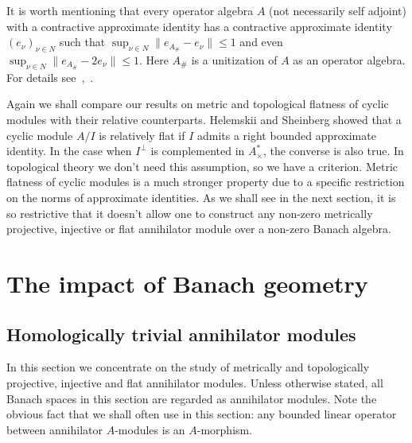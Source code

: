 It is worth mentioning that every operator algebra $A$ (not necessarily self
adjoint) with a contractive approximate identity has a contractive approximate
identity ${(e_\nu)}_{\nu\in N}$ such 
that $\sup_{\nu\in N}\lVert e_{A_\#}-e_\nu\rVert\leq 1$ and 
even $\sup_{\nu\in N}\lVert e_{A_\#}-2e_\nu\rVert\leq 1$. Here $A_\#$ is 
a unitization of $A$ as an operator algebra. For details
see~\cite{PosAndApproxIdinBanAlg},~\cite{BleContrAppIdInOpAlg}.

Again we shall compare our results on metric and topological flatness of cyclic
modules with their relative counterparts. Helemskii and Sheinberg showed
\cite[theorem VII.1.20]{HelHomolBanTopAlg} that a cyclic module $A/I$ is relatively
flat if $I$ admits a right bounded approximate identity. In the case when $I^\perp$
is complemented in $A_\times^*$, the converse is also true. In topological theory
we don't need this assumption, so we have a criterion. Metric flatness of cyclic
modules is a much stronger property due to a specific restriction on the norms of
approximate identities. As we shall see in the next section, it is so restrictive
that it doesn't allow one to construct any non-zero metrically
projective, injective or flat annihilator module over a non-zero Banach algebra.


\section{
    The impact of Banach geometry}\label{SectionTheImpactOfBanachGeometry}



\subsection{
    Homologically trivial annihilator modules}\label{SubSectionHomoligicallyTrivialAnnihilatorModules}

In this section we concentrate on the study of metrically and topologically
projective, injective and flat annihilator modules. Unless otherwise stated, all
Banach spaces in this section are regarded as annihilator modules. Note the
obvious fact that we shall often use in this section: any bounded linear
operator between annihilator $A$-modules is an $A$-morphism.

